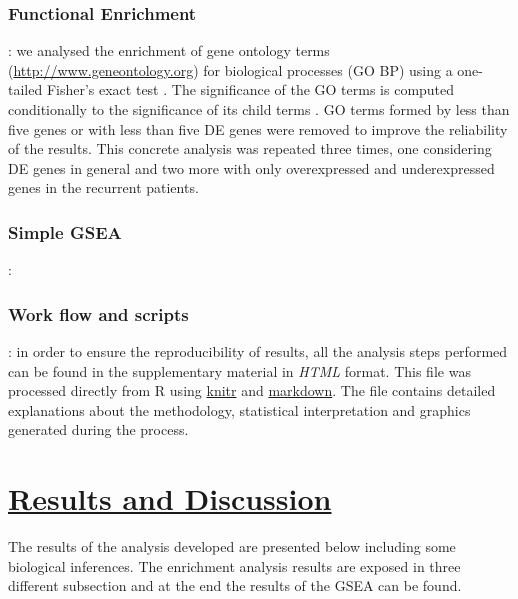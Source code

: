 \documentclass[9pt,twocolumn,twoside]{gsajnl}
\begin{document}
\subsubsection*{Functional Enrichment}: we analysed the enrichment of gene ontology terms (\url{http://www.geneontology.org}) for biological processes (GO BP) using a one-tailed Fisher's exact test \citep{Fisher1922}. The significance of the GO terms is computed conditionally to the significance of its child terms \citep{Alexa2006}. GO terms formed by less than five genes or with less than five DE genes were removed to improve the reliability of the results. This concrete analysis was repeated three times, one considering DE genes in general and two more with only overexpressed and underexpressed genes in the recurrent patients. 

\subsubsection*{Simple GSEA}: %

\subsubsection*{Work flow and scripts}: in order to ensure the reproducibility of results, all the analysis steps performed can be found in the supplementary material in \textit{HTML} format. This file was processed directly from R using 
\href{http://cran.r-project.org/web/packages/knitr/index.html}{knitr} and \href{http://cran.r-project.org/web/packages/markdown/index.html}{markdown}. The file contains detailed explanations about the methodology, statistical interpretation and graphics generated during the process. 


\section*{\underline{Results and Discussion}}

The results of the analysis developed are presented below including some biological inferences. The enrichment analysis results are exposed in three different subsection and at the end the results of the GSEA can be found. 
\end{document}

